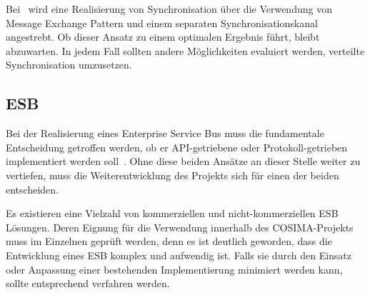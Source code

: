   Bei~\citep{antons09} wird eine Realisierung von Synchronisation über die Verwendung von Message Exchange Pattern und einem separaten Synchronisationskanal angestrebt. Ob dieser Ansatz zu einem optimalen Ergebnis führt, bleibt abzuwarten. In jedem Fall sollten andere Möglichkeiten evaluiert werden, verteilte Synchronisation umzusetzen.


\subsection{ESB} %
\label{sub:esb_fragen}

  Bei der Realisierung eines Enterprise Service Bus muss die fundamentale Entscheidung getroffen werden, ob er API-getriebene oder Protokoll-getrieben implementiert werden soll~\citep[S. 59]{soa_in_practice}. Ohne diese beiden Ansätze an dieser Stelle weiter zu vertiefen, muss die Weiterentwicklung des Projekts sich für einen der beiden entscheiden.
  
  Es existieren eine Vielzahl von kommerziellen und nicht-kommerziellen ESB Lösungen. Deren Eignung für die Verwendung innerhalb des COSIMA-Projekts muss im Einzelnen geprüft werden, denn es ist deutlich geworden, dass die Entwicklung eines ESB komplex und aufwendig ist. Falls sie durch den Einsatz oder Anpassung einer bestehenden Implementierung minimiert werden kann, sollte entsprechend verfahren werden.



